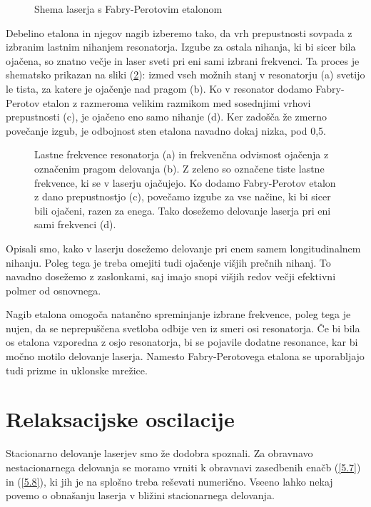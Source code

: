 \begin{figure}[h]
\centering
\def\svgwidth{90truemm} 

\caption{Shema laserja s Fabry-Perotovim etalonom}
\label{fig:FPres}
\end{figure}
Debelino etalona in njegov nagib 
izberemo tako, da vrh prepustnosti sovpada z izbranim lastnim nihanjem resonatorja. 
Izgube za ostala nihanja, ki bi sicer bila ojačena, so znatno večje in laser
sveti pri eni sami izbrani frekvenci. Ta proces je shematsko prikazan na sliki 
(\ref{fig:FPmodes}): izmed vseh možnih stanj v resonatorju (a) svetijo le tista, za katere
je ojačenje nad pragom (b). Ko v resonator dodamo Fabry-Perotov etalon z razmeroma velikim
razmikom med sosednjimi vrhovi prepustnosti (c), je ojačeno eno samo nihanje (d). 
Ker zadošča že zmerno povečanje izgub, je odbojnost sten etalona navadno dokaj nizka, 
pod 0,5. 

\begin{figure}[h]
\centering
\def\svgwidth{100truemm} 

\caption{Lastne frekvence resonatorja (a) in frekvenčna odvisnost ojačenja z označenim 
pragom delovanja (b). Z zeleno so označene tiste lastne frekvence, ki se v laserju ojačujejo. 
Ko dodamo Fabry-Perotov etalon z dano prepustnostjo (c), povečamo
izgube za vse načine, ki bi sicer bili ojačeni, razen za enega. 
Tako dosežemo delovanje laserja pri eni sami frekvenci (d).}
\label{fig:FPmodes}
\end{figure}
Opisali smo, kako v laserju dosežemo delovanje pri enem samem longitudinalnem nihanju.
Poleg tega je treba omejiti tudi ojačenje višjih prečnih nihanj. To navadno 
dosežemo z zaslonkami, saj imajo snopi višjih redov večji efektivni polmer od osnovnega. 
\begin{remark}
Nagib etalona omogoča natančno spreminjanje izbrane frekvence, poleg tega
 je nujen, da se neprepuščena svetloba odbije ven iz smeri osi resonatorja. Če bi 
bila os etalona vzporedna z osjo resonatorja, bi se pojavile dodatne resonance, 
kar bi močno motilo delovanje laserja. Namesto Fabry-Perotovega etalona se uporabljajo
tudi prizme in uklonske mrežice.
\end{remark}

\section{Relaksacijske oscilacije}
Stacionarno delovanje laserjev smo že dodobra spoznali. Za obravnavo
nestacionarnega delovanja  se moramo vrniti k obravnavi zasedbenih enačb 
(\ref{5.7}) in (\ref{5.8}), ki jih je na splošno treba reševati numerično. 
Vseeno lahko nekaj povemo o obnašanju laserja
v bližini stacionarnega delovanja. 

